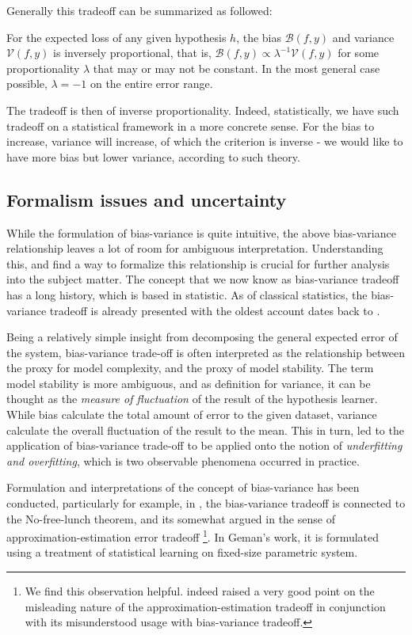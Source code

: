 Generally this tradeoff can be summarized as followed: 
\begin{theorem}
    For the expected loss of any given hypothesis $h$, the bias $\mathcal{B}(f,y)$ and variance $\mathcal{V}(f,y)$ is inversely proportional, that is, $\mathcal{B}(f,y)\propto \lambda^{-1} \mathcal{V}(f,y)$ for some proportionality $\lambda$ that may or may not be constant. In the most general case possible, $\lambda = -1$ on the entire error range. 
\end{theorem}

The tradeoff is then of inverse proportionality. Indeed, statistically, we have such tradeoff on a statistical framework in a more concrete sense. For the bias to increase, variance will increase, of which the criterion is inverse - we would like to have more bias but lower variance, according to such theory. 

\subsection{Formalism issues and uncertainty}

While the formulation of bias-variance is quite intuitive, the above bias-variance relationship leaves a lot of room for ambiguous interpretation. Understanding this, and find a way to formalize this relationship is crucial for further analysis into the subject matter. The concept that we now know as bias-variance tradeoff has a long history, which is based in statistic. As of classical statistics, the bias-variance tradeoff is already presented with the oldest account dates back to \cite{Grenander1952OnES}. 

Being a relatively simple insight from decomposing the general expected error of the system, bias-variance trade-off is often interpreted as the relationship between the proxy for model complexity, and the proxy of model stability. The term model stability is more ambiguous, and as definition for variance, it can be thought as the \textit{measure of fluctuation} of the result of the hypothesis learner. While bias calculate the total amount of error to the given dataset, variance calculate the overall fluctuation of the result to the mean. This in turn, led to the application of bias-variance trade-off to be applied onto the notion of \textit{underfitting and overfitting}, which is two observable phenomena occurred in practice. 

Formulation and interpretations of the concept of bias-variance has been conducted, particularly for example, in \cite{10.5555/2621980}, the bias-variance tradeoff is connected to the No-free-lunch theorem, and its somewhat argued in the sense of approximation-estimation error tradeoff \footnote{We find this observation helpful. \cite{brown2024biasvariance} indeed raised a very good point on the misleading nature of the approximation-estimation tradeoff in conjunction with its misunderstood usage with bias-variance tradeoff.}. In Geman's work, it is formulated using a treatment of statistical learning on fixed-size parametric system. 

